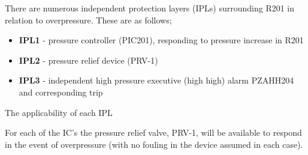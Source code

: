  There are numerous  independent protection layers (IPLs) surrounding R201 in relation to overpressure. These are as follows;
 
 \begin{itemize}
\item  \textbf{IPL1} - pressure controller (PIC201), responding to pressure increase in R201
\item  \textbf{IPL2} - pressure relief device (PRV-1)
\item  \textbf{IPL3} - independent high pressure executive (high high) alarm PZAHH204 and corresponding trip
 \end{itemize}



The applicability of each IPL 





For each of the IC's the pressure relief valve, PRV-1, will be available to respond in the event of overpressure (with no fouling in the device assumed in each case). 





 